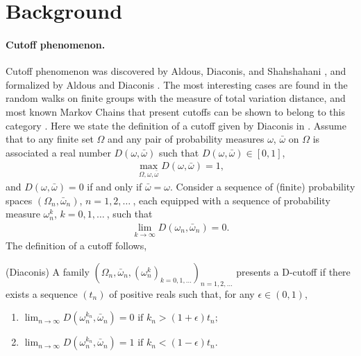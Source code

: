 %
%
\section{Background}
\label{sec:background}

\paragraph{Cutoff phenomenon.} Cutoff phenomenon was discovered by Aldous, Diaconis, and Shahshahani \cite{Diaconis1987, Diaconis1986, Diaconis1981}, and
formalized by Aldous and Diaconis \cite{Diaconis1996, Diaconis1987}. The most interesting cases are found in the random walks on finite
groups with the measure of total variation distance, and most known Markov Chains that present cutoffs can be shown to belong to this
category \cite{LSaloff-Costt2004}. Here we state the definition of a cutoff given by Diaconis in \cite{Diaconis2005}. Assume that to any
finite set $\Omega$ and any pair of probability measures $\omega$, $\bar{\omega}$ on $\Omega$ is associated a real number
$D(\omega,\bar{\omega})$ such that $D(\omega,\bar{\omega})\in [0,1]$,
\begin{eqnarray}
\max_{\Omega,\omega,\bar{\omega}} D(\omega,\bar{\omega}) = 1,
\end{eqnarray}
and $D(\omega,\bar{\omega})=0$ if and only if $\bar{\omega}=\omega$. Consider a sequence of
(finite) probability spaces $(\Omega_n,\bar{\omega}_n)$, $n=1,2,\ldots\ $, each equipped with a sequence
of probability measure $\omega^k_n$, $k=0,1,\ldots\ $, such that
\begin{eqnarray}
\lim_{k \to \infty} D(\omega_n,\bar{\omega}_n)=0.
\end{eqnarray}
The definition of a cutoff follows,

\begin{definition}
\label{cutoffdefinitions} (Diaconis) A family $(\Omega_n,\bar{\omega}_n, (\omega^k_n)_{k=0,1,\ldots})_{n=1,2,\ldots}$ presents a D-cutoff if
there exists a sequence $(t_n)$ of positive reals such that, for any $\epsilon \in(0,1)$,
\begin{enumerate}
  \item $\lim_{n \to \infty}D(\omega^{k_n}_n,\bar{\omega}_n) = 0 \mbox{ if }
  k_n>(1+\epsilon)t_n;$
  \item $\lim_{n \to \infty}D(\omega^{k_n}_n,\bar{\omega}_n) = 1 \mbox{ if }
  k_n<(1-\epsilon)t_n.$
\end{enumerate}
\end{definition}

